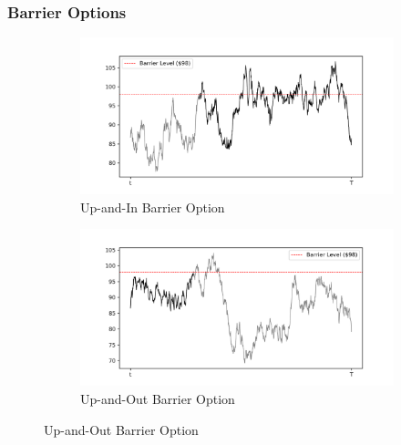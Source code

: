 \documentclass[a4paper]{report}
\begin{document}
\subsubsection{Barrier Options}\label{barrier}
\begin{figure}[H]
    \begin{subfigure}{.5\linewidth}
      \includegraphics[width=\linewidth]{images/up_in_option.png}
      \caption{Up-and-In Barrier Option}
      \label{fig:up_in_option}
    \end{subfigure}\hfill
    \begin{subfigure}{.5\linewidth}
      \includegraphics[width=\linewidth]{images/up_out_option.png}
      \caption{Up-and-Out Barrier Option}
      \label{fig:up_out_option}
    \end{subfigure}
    

\end{figure}
\end{document}
